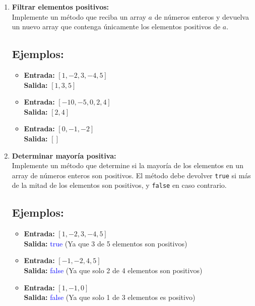 \begin{enumerate}[label=\alph*)]
    \item \textbf{Filtrar elementos positivos:} \\
    Implemente un método que reciba un array \(a\) de números enteros y devuelva un nuevo array que contenga únicamente los elementos positivos de \(a\).

    \subsection*{Ejemplos:}
    \begin{itemize}
        \item \textbf{Entrada:} \([1, -2, 3, -4, 5]\) \\
        \textbf{Salida:} \([1, 3, 5]\)
        \item \textbf{Entrada:} \([-10, -5, 0, 2, 4]\) \\
        \textbf{Salida:} \([2, 4]\)
        \item \textbf{Entrada:} \([0, -1, -2]\) \\
        \textbf{Salida:} \([]\)
    \end{itemize}

    \item \textbf{Determinar mayoría positiva:} \\
    Implemente un método que determine si la mayoría de los elementos en un array de números enteros son positivos. El método debe devolver \texttt{true} si más de la mitad de los elementos son positivos, y \texttt{false} en caso contrario.

    \subsection*{Ejemplos:}
    \begin{itemize}
        \item \textbf{Entrada:} \([1, -2, 3, -4, 5]\) \\
        \textbf{Salida:} \textcolor{blue}{true}  (Ya que 3 de 5 elementos son positivos)
        \item \textbf{Entrada:} \([-1, -2, 4, 5]\) \\
        \textbf{Salida:} \textcolor{blue}{false}  (Ya que solo 2 de 4 elementos son positivos)
        \item \textbf{Entrada:} \([1, -1, 0]\) \\
        \textbf{Salida:} \textcolor{blue}{false}  (Ya que solo 1 de 3 elementos es positivo)
    \end{itemize}
\end{enumerate}